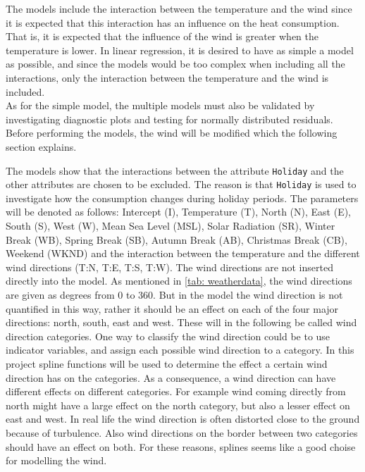 The models include the interaction between the temperature and the wind since it is expected that this interaction has an influence on the heat consumption. That is, it is expected that the influence of the wind is greater when the temperature is lower. In linear regression, it is desired to have as simple a model as possible, and since the models would be too complex when including all the interactions, only the interaction between the temperature and the wind is included.\\

\noindent As for the simple model, the multiple models must also be validated by investigating diagnostic plots and testing for normally distributed residuals. Before performing the models, the wind will be modified which the following section explains.

\noindent The models show that the interactions between the attribute \texttt{Holiday} and the other attributes are chosen to be excluded. The reason is that \texttt{Holiday} is used to investigate how the consumption changes during holiday periods. The parameters will be denoted as follows: Intercept (I), Temperature (T), North (N), East (E), South (S), West (W), Mean Sea Level (MSL), Solar Radiation (SR), Winter Break (WB), Spring Break (SB), Autumn Break (AB), Christmas Break (CB), Weekend (WKND) and the interaction between the temperature and the different wind directions (T:N, T:E, T:S, T:W). The wind directions are not inserted directly into the model. As mentioned in \cref{tab: weatherdata}, the wind directions are given as degrees from $0$ to $360$. But in the model the wind direction is not quantified in this way, rather it should be an effect on each of the four major directions: north, south, east and west. These will in the following be called wind direction categories. One way to classify the wind direction could be to use indicator variables, and assign each possible wind direction to a category. In this project spline functions will be used to determine the effect a certain wind direction has on the categories. As a consequence, a wind direction can have different effects on different categories. For example wind coming directly from north might have a large effect on the north category, but also a lesser effect on east and west. In real life the wind direction is often distorted close to the ground because of turbulence. Also wind directions on the border between two categories should have an effect on both. For these reasons, splines seems like a good choise for modelling the wind.


